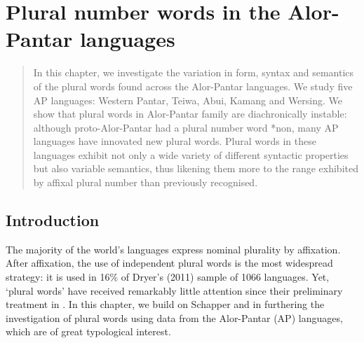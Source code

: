 
\chapter{Plural number words in the Alor-Pantar languages}


\begin{abstract}
In this chapter, we investigate the variation in form, syntax and semantics of the plural words found across the Alor-Pantar languages. We study five AP languages: Western Pantar, Teiwa, Abui, Kamang and Wersing. We show that plural words in Alor-Pantar family are diachronically instable: although proto-Alor-Pantar had a plural number word *non, many AP languages have innovated new plural words. Plural words in these languages exhibit not only a wide variety of different syntactic properties but also variable semantics, thus likening them more to the range exhibited by affixal plural number than previously recognised.

\end{abstract}


\section{Introduction}%
\label{sec:9:1}
 
\hypertarget{Toc376962648}{}
The majority of the world's languages express nominal plurality by affixation. After affixation, the use of independent plural words is the most widespread strategy: it is used in 16\% of Dryer's (2011) sample of 1066 languages.\nocite{Dryer2011} Yet, `plural words' have received remarkably little attention since their preliminary treatment in \citet{Dryer1989}. In this chapter, we build on Schapper and \citet{Klamer2011} in furthering the investigation of plural words using data from the Alor-Pantar (AP) languages, which are of great typological interest.

